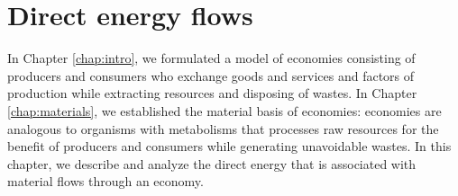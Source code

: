 %
%
%


\chapter{Direct energy flows}
\label{chap:direct_energy} 






In Chapter \ref{chap:intro}, we formulated a model of economies
consisting of producers and consumers who exchange
goods and services and factors of production 
while extracting resources and disposing of wastes. 
In Chapter \ref{chap:materials}, we established the material basis of economies: 
economies are analogous to organisms with metabolisms that processes
raw resources for the benefit of producers and consumers 
while generating unavoidable wastes.
In this chapter, we describe and analyze the 
direct energy
that is associated with material flows
through an economy.

